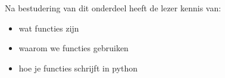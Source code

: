 Na bestudering van dit onderdeel heeft de lezer kennis van:
\begin{itemize}
\item wat functies zijn
\item waarom we functies gebruiken
\item hoe je functies schrijft in python
\end{itemize}

